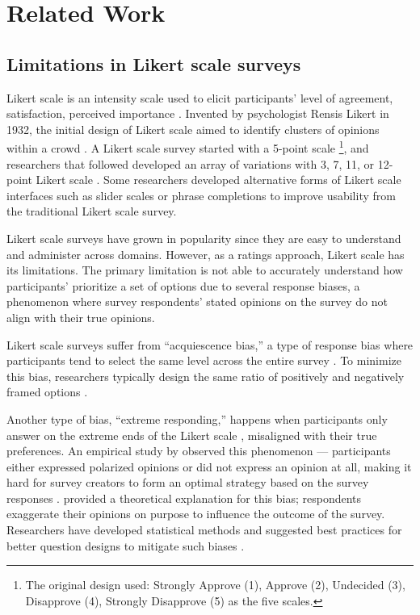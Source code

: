 \section{Related Work} \label{related_works}

\subsection{Limitations in Likert scale surveys}
Likert scale is an intensity scale used to elicit participants' level of agreement, satisfaction, perceived importance \cite{likert1932technique}. Invented by psychologist Rensis Likert in 1932, the initial design of Likert scale aimed to identify clusters of opinions within a crowd \cite{joshi2015likert}. A Likert scale survey started with a 5-point scale \footnote{The original design used: Strongly Approve (1), Approve (2), Undecided (3), Disapprove (4), Strongly Disapprove (5) as the five scales.}, and researchers that followed developed an array of variations with 3, 7, 11, or 12-point Likert scale \cite{garland2008computer,finstad2010}. Some researchers developed alternative forms of Likert scale interfaces such as slider scales \cite{roster2015exploring} or phrase completions \cite{hodge2003phrase} to improve usability from the traditional Likert scale survey. 

Likert scale surveys have grown in popularity since they are easy to understand and administer across domains. However, as a ratings approach, Likert scale has its limitations. The primary limitation is not able to accurately understand how participants' prioritize a set of options due to several response biases, a phenomenon where survey respondents' stated opinions on the survey do not align with their true opinions. 

Likert scale surveys suffer from ``acquiescence bias,'' a type of response bias where participants tend to select the same level across the entire survey \cite{alwin1985measurement, moors2016two}. To minimize this bias, researchers typically design the same ratio of positively and negatively framed options \cite{kuru2016improving}. 

Another type of bias, ``extreme responding,'' happens when participants only answer on the extreme ends of the Likert scale \cite{batchelor2016extreme, furnham1986response, meisenberg2008acquiescent}, misaligned with their true preferences. An empirical study by \textcite{quarfoot2017quadratic} observed this phenomenon --- participants either expressed polarized opinions or did not express an opinion at all, making it hard for survey creators to form an optimal strategy based on the survey responses \cite{posner2018radical}. \textcite{cavaille2018towards} provided a theoretical explanation for this bias; respondents exaggerate their opinions on purpose to influence the outcome of the survey. Researchers have developed statistical methods and suggested best practices for better question designs to mitigate such biases \cite{glaser2008response}.

